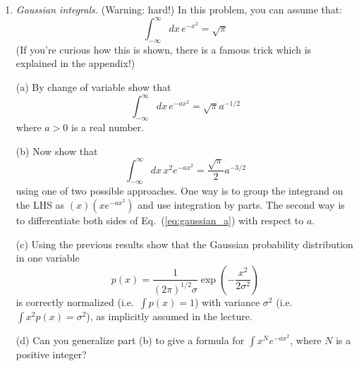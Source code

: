 \documentclass[aps,prd,superscriptaddress,groupedaddress,nofootinbib,nobibnotes]{revtex4}
\newcommand{\be}{\begin{equation}}
\newcommand{\ee}{\end{equation}}
\begin{document}
\begin{enumerate}
\item {\em Gaussian integrals.} (Warning: hard!) In this problem, you can assume that:
\be
\int_{-\infty}^\infty dx \, e^{-x^2} = \sqrt{\pi}
\ee
(If you're curious how this is shown, there is a famous trick which is explained in the appendix!)
\par\medskip
(a) By change of variable show that
\be
\int_{-\infty}^\infty dx \, e^{-ax^2} = \sqrt{\pi} a^{-1/2}  \label{eq:gaussian_a}
\ee
where $a > 0$ is a real number.
\par\medskip
(b) Now show that 
\be
\int_{-\infty}^\infty dx \, x^2 e^{-ax^2} = \frac{\sqrt{\pi}}{2} a^{-3/2}   \label{eq:gaussian_a2}
\ee
using one of two possible approaches.  One way is to group the integrand on the LHS as $(x) (x e^{-ax^2})$
and use integration by parts.  The second way is to differentiate both sides of Eq.~(\ref{eq:gaussian_a})
with respect to $a$.
\par\medskip
(c) Using the previous results show that the Gaussian probability distribution in one variable
\be
p(x) = \frac{1}{(2\pi)^{1/2} \sigma} \exp\left( - \frac{x^2}{2\sigma^2} \right)
\ee
is correctly normalized (i.e.~$\int p(x) = 1$) with variance $\sigma^2$ 
(i.e.~$\int x^2 p(x) = \sigma^2$), as implicitly assumed in the lecture.
\par\medskip
(d) Can you generalize part (b) to give a formula for $\int x^N e^{-ax^2}$, where $N$ is a positive integer?

\end{enumerate}



%

% 
% 
\end{document}
